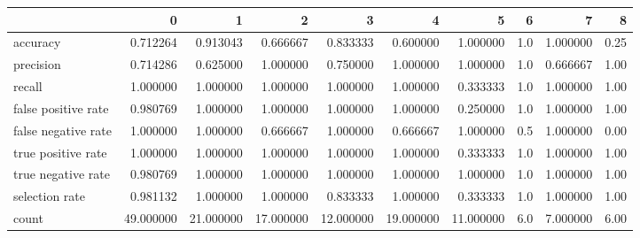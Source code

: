 \begin{tabular}{lrrrrrrrrr}
\toprule
{} &          0 &          1 &          2 &          3 &          4 &          5 &    6 &         7 &     8 \\
\midrule
accuracy            &   0.712264 &   0.913043 &   0.666667 &   0.833333 &   0.600000 &   1.000000 &  1.0 &  1.000000 &  0.25 \\
precision           &   0.714286 &   0.625000 &   1.000000 &   0.750000 &   1.000000 &   1.000000 &  1.0 &  0.666667 &  1.00 \\
recall              &   1.000000 &   1.000000 &   1.000000 &   1.000000 &   1.000000 &   0.333333 &  1.0 &  1.000000 &  1.00 \\
false positive rate &   0.980769 &   1.000000 &   1.000000 &   1.000000 &   1.000000 &   0.250000 &  1.0 &  1.000000 &  1.00 \\
false negative rate &   1.000000 &   1.000000 &   0.666667 &   1.000000 &   0.666667 &   1.000000 &  0.5 &  1.000000 &  0.00 \\
true positive rate  &   1.000000 &   1.000000 &   1.000000 &   1.000000 &   1.000000 &   0.333333 &  1.0 &  1.000000 &  1.00 \\
true negative rate  &   0.980769 &   1.000000 &   1.000000 &   1.000000 &   1.000000 &   1.000000 &  1.0 &  1.000000 &  1.00 \\
selection rate      &   0.981132 &   1.000000 &   1.000000 &   0.833333 &   1.000000 &   0.333333 &  1.0 &  1.000000 &  1.00 \\
count               &  49.000000 &  21.000000 &  17.000000 &  12.000000 &  19.000000 &  11.000000 &  6.0 &  7.000000 &  6.00 \\
\bottomrule
\end{tabular}
